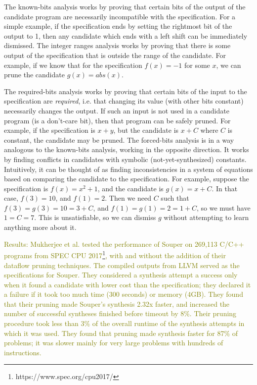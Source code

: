 \documentclass[12pt,twoside]{reedthesis}
\newcommand{\green}[1]{\textcolor{olive}{#1}}
\begin{document}
            The known-bits analysis works by proving that certain bits of the output of the candidate program are necessarily incompatible with the specification.
                For a simple example, if the specification ends by setting the rightmost bit of the output to 1, then any candidate which ends with a left shift can be immediately dismissed.
            The integer ranges analysis works by proving that there is some output of the specification that is outside the range of the candidate.
                For example, if we know that for the specification $f(x) = -1$ for some $x$, we can prune the candidate $g(x) = abs(x)$.
            
            The required-bits analysis works by proving that certain bits of the input to the specification are \textit{required}, i.e. that changing its value (with other bits constant) necessarily changes the output.
                If such an input is not used in a candidate program (is a don't-care bit), then that program can be safely pruned.
                    For example, if the specification is $x + y$, but the candidate is $x + C$ where $C$ is constant, the candidate may be pruned.
            The forced-bits analysis is in a way analogous to the known-bits analysis, working in the opposite direction.
                It works by finding conflicts in candidates with symbolic (not-yet-synthesized) constants.
                Intuitively, it can be thought of as finding inconsistencies in a system of equations based on comparing the candidate to the specification.
                For example, suppose the specification is $f(x) = x^2 + 1$, and the candidate is $g(x) = x + C$. In that case, $f(3) = 10$, and $f(1) = 2$. Then we need $C$ such that $f(3) = g(3) = 10 = 3 + C$, and $f(1) = g(1) = 2 = 1 + C$, so we must have $1 = C = 7$. This is unsatisfiable, so we can dismiss $g$ without attempting to learn anything more about it.
            
            \green{
            Results: Mukherjee et al. tested the performance of Souper on 269,113 C/C++ programs from SPEC CPU 2017\footnote{https://www.spec.org/cpu2017/}, with and without the addition of their dataflow pruning techniques.
            The compiled outputs from LLVM served as the specifications for Souper.
            They considered a synthesis attempt a success only when it found a candidate with lower cost than the specification;
            they declared it a failure if it took too much time (300 seconds) or memory (4GB).
            They found that their pruning made Souper's synthesis 2.32x faster, and increased the number of successful syntheses finished before timeout by 8\%.
            Their pruning procedure took less than 3\% of the overall runtime of the synthesis attempts in which it was used.
            They found that pruning made synthesis faster for 87\% of problems; it was slower mainly for very large problems with hundreds of instructions.
            }
\end{document}
